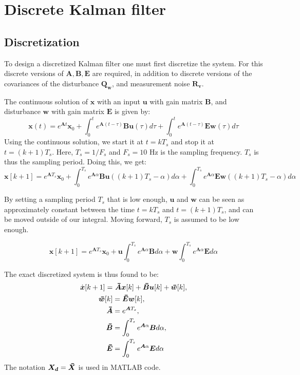 \section{Discrete Kalman filter}
\subsection{Discretization}
To design a discretized Kalman filter one must first discretize the system. For this discrete versions of $\bm{A}, \bm{B}, \bm{E}$ are required, in addition to discrete versions of the covariances of the disturbance $\bm{Q_w}$, and measurement noise $\bm{R_v}$.

The continuous solution of $\bm{x}$ with an input $\bm{u}$ with gain matrix $\bm{B}$, and disturbance $\bm{w}$ with gain matrix $\bm{E}$ is given by:
\begin{equation*}
\bm{x}(t) = e^{\bm{A}t}\bm{x}_0 + \int_0^te^{\bm{A}(t-\tau)}\bm{Bu}(\tau)d\tau + \int_0^te^{\bm{A}(t-\tau)}\bm{Ew}(\tau)d\tau
\end{equation*}
Using the continuous solution, we start it at $t=kT_s$ and stop it at $t=(k+1)T_s$. Here, $T_s = 1/F_s$ and $F_s = 10$ Hz is the sampling frequency. $T_s$ is thus the sampling period. Doing this, we get:
\begin{equation}
\bm{x}[k+1] = e^{\bm{A}T_s}\bm{x}_0 + \int_0^{T_s} e^{\bm{A}\alpha}\bm{Bu}((k+1)T_s -\alpha)d\alpha + \int_0^{T_s} e^{\bm{A}\alpha}\bm{Ew}((k+1)T_s -\alpha)d\alpha \label{x_disc}
\end{equation}

By setting a sampling period $T_s$ that is low enough, $\bm{u}$ and $\bm{w}$ can be seen as approximately constant between the time $t = kT_s$ and $t = (k+1)T_s$, and can be moved outside of our integral. Moving forward, $T_s$ is assumed to be low enough.

\begin{equation}
\bm{x}[k+1] = e^{\bm{A}T_s}\bm{x}_0 + \bm{u}\int_0^{T_s} e^{\bm{A}\alpha}\bm{B}d\alpha + \bm{w}\int_0^{T_s} e^{\bm{A}\alpha}\bm{E}d\alpha \label{x_disc_const}
\end{equation}

The exact discretized system is thus found to be:
\begin{subequations}
\begin{align}
    \dot{\bm{x}}[k+1] =& \ \thickbar{\bm{A}}\bm{x}[k]+\thickbar{\bm{B}}\bm{u}[k] + \thickbar{\bm{w}}[k], \\
    \thickbar{\bm{w}}[k] &= \thickbar{\bm{E}}\bm{w}[k], \label{w_bar} \\
    \thickbar{\bm{A}} &= e^{\bm{A}T_s}, \\
    \thickbar{\bm{B}} &= \int_{0}^{T_s}e^{\bm{A}\alpha}\bm{B}d\alpha \label{B_d}, \\
    \thickbar{\bm{E}} &= \int_{0}^{T_s}e^{\bm{A}\alpha}\bm{E}d\alpha \label{E_d}
\end{align}
\end{subequations}
The notation $\bm{X_d} = \thickbar{\bm{X}}$ is used in MATLAB code.

